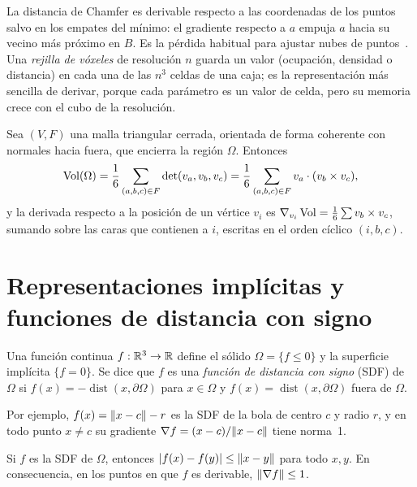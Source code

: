 La distancia de Chamfer es derivable respecto a las coordenadas de los puntos salvo en los empates del mínimo: el gradiente respecto a $a$ empuja $a$ hacia su vecino más próximo en $B$. Es la pérdida habitual para ajustar nubes de puntos~\cite{cmu16825}. Una \emph{rejilla de vóxeles} de resolución $n$ guarda un valor (ocupación, densidad o distancia) en cada una de las $n^3$ celdas de una caja; es la representación más sencilla de derivar, porque cada parámetro es un valor de celda, pero su memoria crece con el cubo de la resolución.

\begin{proposicion}\label{prop:volumen}
Sea $(V,F)$ una malla triangular cerrada, orientada de forma coherente con normales hacia fuera, que encierra la región $\Omega$. Entonces
\[
\operatorname{Vol}(\Omega)=\frac16\sum_{(a,b,c)\in F}\det(v_a,v_b,v_c)=\frac16\sum_{(a,b,c)\in F}v_a\cdot(v_b\times v_c),
\]
y la derivada respecto a la posición de un vértice $v_i$ es $\nabla_{v_i}\operatorname{Vol}=\frac16\sum v_b\times v_c$, sumando sobre las caras que contienen a $i$, escritas en el orden cíclico $(i,b,c)$.
\end{proposicion}

\addtocounter{definicion}{1}%

\section{Representaciones implícitas y funciones de distancia con signo}

\begin{definicion}\label{def:sdf}
Una función continua $f:\mathbb{R}^3\to\mathbb{R}$ define el sólido $\Omega=\{f\le 0\}$ y la superficie implícita $\{f=0\}$. Se dice que $f$ es una \emph{función de distancia con signo} (SDF) de $\Omega$ si $f(x)=-\operatorname{dist}(x,\partial\Omega)$ para $x\in\Omega$ y $f(x)=\operatorname{dist}(x,\partial\Omega)$ fuera de $\Omega$.
\end{definicion}

Por ejemplo, $f(x)=\lVert x-c\rVert-r$ es la SDF de la bola de centro $c$ y radio $r$, y en todo punto $x\ne c$ su gradiente $\nabla f=(x-c)/\lVert x-c\rVert$ tiene norma~1.

\begin{proposicion}\label{prop:lipschitz}
Si $f$ es la SDF de $\Omega$, entonces $\lvert f(x)-f(y)\rvert\le\lVert x-y\rVert$ para todo $x,y$. En consecuencia, en los puntos en que $f$ es derivable, $\lVert\nabla f\rVert\le 1$.
\end{proposicion}

